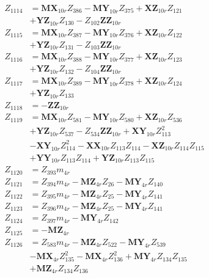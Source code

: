 \begin{multicols}{2}
\begin{align}
Z_{1114} &= \mathbf{MX}_{10r}Z_{386} - \mathbf{MY}_{10r}Z_{375} + \mathbf{XZ}_{10r}Z_{121}  \nonumber \\
&+ \mathbf{YZ}_{10r}Z_{130} - Z_{102}\mathbf{ZZ}_{10r} \nonumber \\
Z_{1115} &= \mathbf{MX}_{10r}Z_{387} - \mathbf{MY}_{10r}Z_{376} + \mathbf{XZ}_{10r}Z_{122}  \nonumber \\
&+ \mathbf{YZ}_{10r}Z_{131} - Z_{103}\mathbf{ZZ}_{10r} \nonumber \\
Z_{1116} &= \mathbf{MX}_{10r}Z_{388} - \mathbf{MY}_{10r}Z_{377} + \mathbf{XZ}_{10r}Z_{123}  \nonumber \\
&+ \mathbf{YZ}_{10r}Z_{132} - Z_{104}\mathbf{ZZ}_{10r} \nonumber \\
Z_{1117} &= \mathbf{MX}_{10r}Z_{389} - \mathbf{MY}_{10r}Z_{378} + \mathbf{XZ}_{10r}Z_{124}  \nonumber \\
&+ \mathbf{YZ}_{10r}Z_{133} \nonumber \\
Z_{1118} &= -\mathbf{ZZ}_{10r} \nonumber \\
Z_{1119} &= \mathbf{MX}_{10r}Z_{581} - \mathbf{MY}_{10r}Z_{580} + \mathbf{XZ}_{10r}Z_{536}  \nonumber \\
&+ \mathbf{YZ}_{10r}Z_{537} - Z_{534}\mathbf{ZZ}_{10r} + \mathbf{XY}_{10r}Z_{113}^2  \nonumber \\
&- \mathbf{XY}_{10r}Z_{114}^2 - \mathbf{XX}_{10r}Z_{113}Z_{114} - \mathbf{XZ}_{10r}Z_{114}Z_{115}  \nonumber \\
&+ \mathbf{YY}_{10r}Z_{113}Z_{114} + \mathbf{YZ}_{10r}Z_{113}Z_{115} \nonumber \\
Z_{1120} &= Z_{393}m_{4r} \nonumber \\
Z_{1121} &= Z_{394}m_{4r} - \mathbf{MZ}_{4r}Z_{26} - \mathbf{MY}_{4r}Z_{140} \nonumber \\
Z_{1122} &= Z_{395}m_{4r} - \mathbf{MZ}_{4r}Z_{25} - \mathbf{MY}_{4r}Z_{141} \nonumber \\
Z_{1123} &= Z_{396}m_{4r} - \mathbf{MZ}_{4r}Z_{25} - \mathbf{MY}_{4r}Z_{141} \nonumber \\
Z_{1124} &= Z_{397}m_{4r} - \mathbf{MY}_{4r}Z_{142} \nonumber \\
Z_{1125} &= -\mathbf{MZ}_{4r} \nonumber \\
Z_{1126} &= Z_{583}m_{4r} - \mathbf{MZ}_{4r}Z_{522} - \mathbf{MY}_{4r}Z_{539}  \nonumber \\
&- \mathbf{MX}_{4r}Z_{135}^2 - \mathbf{MX}_{4r}Z_{136}^2 + \mathbf{MY}_{4r}Z_{134}Z_{135}  \nonumber \\
&+ \mathbf{MZ}_{4r}Z_{134}Z_{136} \nonumber \\

\end{align}
\end{multicols}
